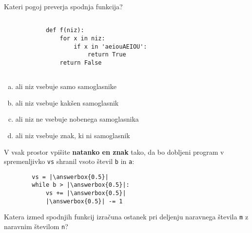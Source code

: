 \documentclass[arhiv, 10pt]{../izpit}
\newcommand{\inlinepy}[1]{\texttt{#1}}
\newcommand{\answerbox}[1]{\framebox{\vphantom{\large M}\hspace{#1cm}}}
\begin{document}
        \naloga*

        \begin{multicols}{2}
        \noindent
        Kateri pogoj preverja spodnja funkcija?
        \begin{verbatim}
        
            def f(niz):
                for x in niz:
                    if x in 'aeiouAEIOU':
                        return True
                return False
            
        \end{verbatim}

        \begin{enumerate}[(a)]
\item ali niz vsebuje samo samoglasnike
\item ali niz vsebuje kakšen samoglasnik
\item ali niz ne vsebuje nobenega samoglasnika
\item ali niz vsebuje znak, ki ni samoglasnik
\end{enumerate}

        \end{multicols}
    
        \naloga*
        \begin{multicols}{2}
        \noindent
        V vsak prostor vpišite \textbf{natanko en znak} tako, da bo dobljeni program v spremenljivko \inlinepy{vs} shranil vsoto števil \inlinepy{b} in \inlinepy{a}:
        
        \columnbreak
        \begin{verbatim}
        vs = |\answerbox{0.5}|
        while b > |\answerbox{0.5}|:
            vs += |\answerbox{0.5}|
            |\answerbox{0.5}| -= 1
        \end{verbatim}
        \end{multicols}
    
        \clearpage
        \naloga
        
        Katera izmed spodnjih funkcij izračuna ostanek pri deljenju naravnega števila \inlinepy{m} z naravnim številom \inlinepy{n}?
    
\end{document}
